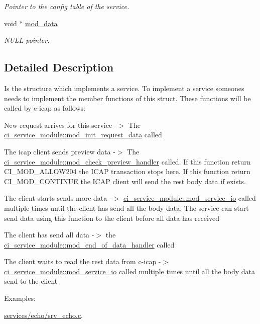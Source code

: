 \begin{DoxyCompactItemize}
\begin{DoxyCompactList}\small\item\em Pointer to the config table of the service. \item\end{DoxyCompactList}\item 
void $\ast$ \hyperlink{structci__service__module_a548856fadc824a5dcc627664e738f2c9}{mod\_\-data}
\begin{DoxyCompactList}\small\item\em NULL pointer. \item\end{DoxyCompactList}\end{DoxyCompactItemize}


\subsection{Detailed Description}
Is the structure which implements a service. To implement a service someones needs to implement the member functions of this struct. These functions will be called by c-\/icap as follows:
\begin{DoxyItemize}
\item New request arrives for this service -\/$>$ The \hyperlink{structci__service__module_a0ab686479bbf157f12c5913efd396c96}{ci\_\-service\_\-module::mod\_\-init\_\-request\_\-data} called
\item The icap client sends preview data -\/$>$ The \hyperlink{structci__service__module_a2a50b9701b4d11e996167c7c992256da}{ci\_\-service\_\-module::mod\_\-check\_\-preview\_\-handler} called. If this function return CI\_\-MOD\_\-ALLOW204 the ICAP transaction stops here. If this function return CI\_\-MOD\_\-CONTINUE the ICAP client will send the rest body data if exists.
\item The client starts sends more data -\/$>$ \hyperlink{structci__service__module_ac79b8c4bd560ee1f5cb21ca604c90978}{ci\_\-service\_\-module::mod\_\-service\_\-io} called multiple times until the client has send all the body data. The service can start send data using this function to the client before all data has received
\item The client has send all data -\/$>$ the \hyperlink{structci__service__module_a4308d4de90013030d311b56d01ba1d53}{ci\_\-service\_\-module::mod\_\-end\_\-of\_\-data\_\-handler} called
\item The client waits to read the rest data from c-\/icap -\/$>$ \hyperlink{structci__service__module_ac79b8c4bd560ee1f5cb21ca604c90978}{ci\_\-service\_\-module::mod\_\-service\_\-io} called multiple times until all the body data send to the client 
\end{DoxyItemize}\begin{Desc}
\item[Examples: ]\par


\hyperlink{services_2echo_2srv__echo_8c-example}{services/echo/srv\_\-echo.c}.\end{Desc}


